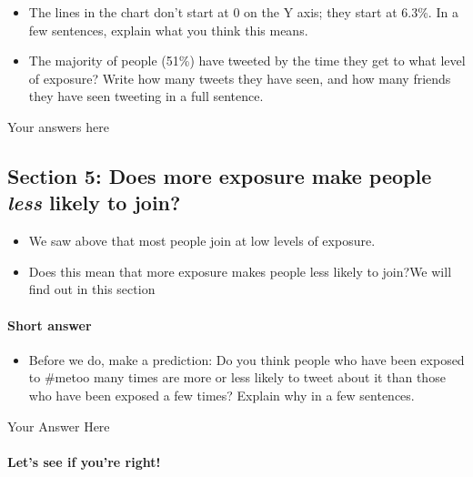 \documentclass[11pt]{article}
\providecommand{\tightlist}{%
      \setlength{\itemsep}{0pt}\setlength{\parskip}{0pt}}
\begin{document}
\begin{itemize}
\tightlist
\item
  The lines in the chart don't start at 0 on the Y axis; they start at
  6.3\%. In a few sentences, explain what you think this means.
\item
  The majority of people (51\%) have tweeted by the time they get to
  what level of exposure? Write how many tweets they have seen, and how
  many friends they have seen tweeting in a full sentence.
\end{itemize}

    Your answers here

    \hypertarget{section-5-does-more-exposure-make-people-less-likely-to-join}{%
\subsection{\texorpdfstring{Section 5: Does more exposure make people
\emph{less} likely to
join?}{Section 5: Does more exposure make people less likely to join?}}\label{section-5-does-more-exposure-make-people-less-likely-to-join}}

\begin{itemize}
\tightlist
\item
  We saw above that most people join at low levels of exposure.
\item
  Does this mean that more exposure makes people less likely to join?We
  will find out in this section
\end{itemize}

\hypertarget{short-answer}{%
\paragraph{Short answer}\label{short-answer}}

\begin{itemize}
\tightlist
\item
  Before we do, make a prediction: Do you think people who have been
  exposed to \#metoo many times are more or less likely to tweet about
  it than those who have been exposed a few times? Explain why in a few
  sentences.
\end{itemize}

    Your Answer Here

    \hypertarget{lets-see-if-youre-right}{%
\paragraph{Let's see if you're right!}\label{lets-see-if-youre-right}}
\end{document}
